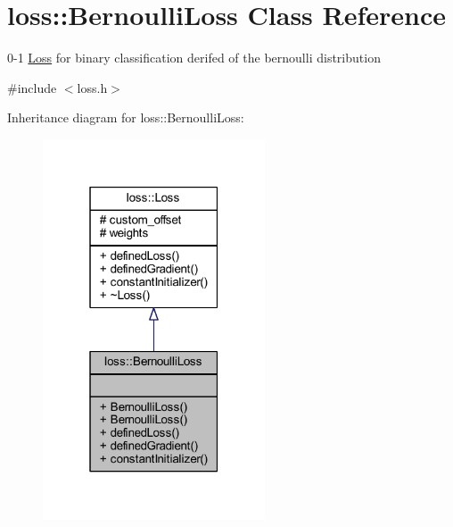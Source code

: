 \hypertarget{classloss_1_1_bernoulli_loss}{}\section{loss\+:\+:Bernoulli\+Loss Class Reference}
\label{classloss_1_1_bernoulli_loss}


0-\/1 \mbox{\hyperlink{classloss_1_1_loss}{Loss}} for binary classification derifed of the bernoulli distribution  




{\ttfamily \#include $<$loss.\+h$>$}



Inheritance diagram for loss\+:\+:Bernoulli\+Loss\+:
\nopagebreak
\begin{figure}[H]
\begin{center}
\leavevmode
\includegraphics[width=187pt]{classloss_1_1_bernoulli_loss__inherit__graph}
\end{center}
\end{figure}


